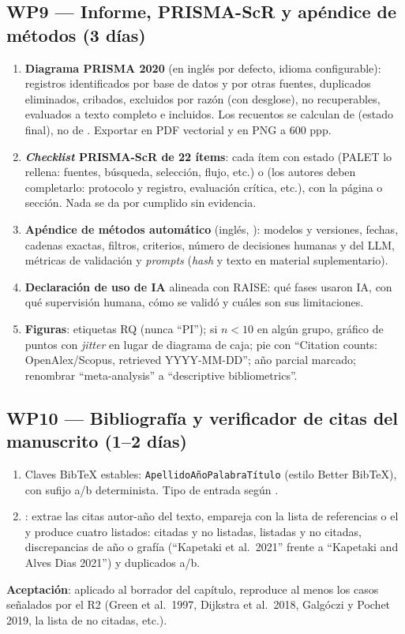 \documentclass[11pt,a4paper]{article}
\newcommand{\WP}[1]{\textbf{\textcolor{palet}{WP#1}}}
\begin{document}
\subsection*{\WP{9} — Informe, PRISMA-ScR y apéndice de métodos (3 días)}
\begin{enumerate}
  \item \textbf{Diagrama PRISMA 2020} (en inglés por defecto, idioma configurable): registros identificados por base de datos y por otras fuentes, duplicados eliminados, cribados, excluidos por razón (con desglose), no recuperables, evaluados a texto completo e incluidos. Los recuentos se calculan de  (estado final), no de . Exportar en PDF vectorial y en PNG a 600 ppp.
  \item \textbf{\emph{Checklist} PRISMA-ScR de 22 ítems}: cada ítem con estado  (PALET lo rellena: fuentes, búsqueda, selección, flujo, etc.) o  (los autores deben completarlo: protocolo y registro, evaluación crítica, etc.), con la página o sección. Nada se da por cumplido sin evidencia.
  \item \textbf{Apéndice de métodos automático} (inglés, ): modelos y versiones, fechas, cadenas exactas, filtros, criterios, número de decisiones humanas y del LLM, métricas de validación y \emph{prompts} (\emph{hash} y texto en material suplementario).
  \item \textbf{Declaración de uso de IA} alineada con RAISE: qué fases usaron IA, con qué supervisión humana, cómo se validó y cuáles son sus limitaciones.
  \item \textbf{Figuras}: etiquetas RQ (nunca ``PI''); si $n<10$ en algún grupo, gráfico de puntos con \emph{jitter} en lugar de diagrama de caja; pie con ``Citation counts: OpenAlex/Scopus, retrieved YYYY-MM-DD''; año parcial marcado; renombrar ``meta-analysis'' a ``descriptive bibliometrics''.
\end{enumerate}

\subsection*{\WP{10} — Bibliografía y verificador de citas del manuscrito (1--2 días)}
\begin{enumerate}
  \item Claves BibTeX estables: \texttt{ApellidoAñoPalabraTítulo} (estilo Better BibTeX), con sufijo a/b determinista. Tipo de entrada según .
  \item {}: extrae las citas autor-año del texto, empareja con la lista de referencias o el  y produce cuatro listados: citadas y no listadas, listadas y no citadas, discrepancias de año o grafía (``Kapetaki et al.\ 2021'' frente a ``Kapetaki and Alves Dias 2021'') y duplicados a/b.
\end{enumerate}
\textbf{Aceptación}: aplicado al borrador del capítulo, reproduce al menos los casos señalados por el R2 (Green et al.\ 1997, Dijkstra et al.\ 2018, Galgóczi y Pochet 2019, la lista de no citadas, etc.).
\end{document}
